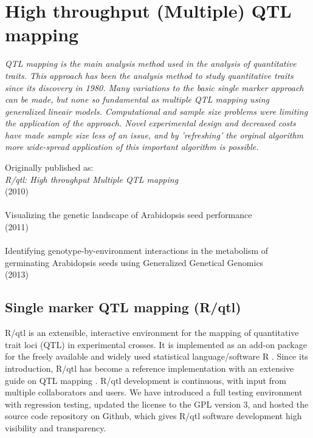 \chapter{High throughput (Multiple) QTL mapping}
\label{chap:mqm}

\emph{QTL mapping is the main analysis method used in the analysis of quantitative traits. This 
approach has been the analysis method to study quantitative traits since its discovery in 1980. 
Many variations to the basic single marker approach can be made, but none so fundamental as 
multiple QTL mapping using generalized lineair models. Computational and sample size problems 
were limiting the application of the approach. Novel experimental design and decreased costs 
have made sample size less of an issue, and by 'refreshing' the orginal algorithm more 
wide-spread application of this important algorithm is possible.}
\null
\vfill

\begin{myexampleblock}{Originally published as:}
  \\
  \emph{R/qtl: High throughput Multiple QTL mapping}\\
   (2010) \\

  \\
  Visualizing the genetic landscape of Arabidopsis seed performance\\
   (2011)\\

  \\
  Identifying genotype-by-environment interactions in the metabolism of germinating Arabidopsis seeds using 
  Generalized Genetical Genomics\\
   (2013)
\end{myexampleblock}

\newpage

\section{Single marker QTL mapping (R/qtl)}
R/qtl is an extensible, interactive environment for the mapping of quantitative trait loci (QTL) 
in experimental crosses. It is implemented as an add-on package for the freely available and 
widely used statistical language/software R \cite{R:2009}. Since its introduction, R/qtl 
\cite{Broman:2003} has become a reference implementation with an extensive guide on QTL mapping 
\cite{RQTLGuide:2009}. R/qtl development is continuous, with input from multiple collaborators 
and users.  We have introduced a full testing environment with regression testing, updated the 
license to the GPL version 3, and hosted the source code repository on Github, which gives R/qtl 
software development high visibility and transparency. 

